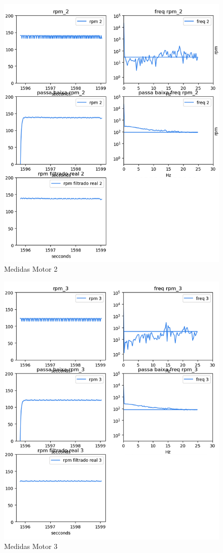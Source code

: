 \begin{figure}[h]
	\centering
	\includegraphics{figures/medidas_motor_2}
	\caption{Medidas Motor 2}
	\label{fig:medidas_motor_2}
\end{figure}


\begin{figure}[h]
	\centering
	\includegraphics{figures/medidas_motor_3}
	\caption{Medidas Motor 3}
	\label{fig:medidas_motor_3}
\end{figure}



